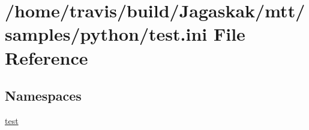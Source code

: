\hypertarget{test_8ini}{\section{/home/travis/build/\-Jagaskak/mtt/samples/python/test.ini File Reference}
\label{test_8ini}
}
\subsection*{Namespaces}
\begin{DoxyCompactItemize}
\item 
\hyperlink{namespacetest}{test}
\end{DoxyCompactItemize}
